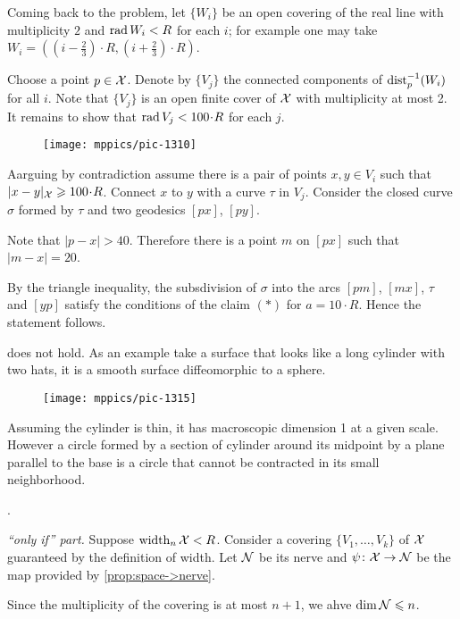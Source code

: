 Coming back to the problem, let $\{W_i\}$ be an open covering of the real line with multiplicity $2$ and $\mathop{\rm rad}\nolimits W_i<R$ for each $i$;
for example one may take $W_i=((i-\tfrac23)\cdot R,(i+\tfrac23)\cdot R)$.

Choose a point $p\in \mathcal{X}$.
Denote by $\{V_j\}$ the connected components of $\mathrm{dist}_p^{-1}(W_i)$ for all $i$.
Note that $\{V_j\}$ is an open finite cover of $\mathcal{X}$ with multiplicity at most 2.
It remains to show that $\rad V_j<100\cdot R$ for each $j$.

\begin{wrapfigure}{o}{31 mm}
\vskip-2mm
\centering
\texttt{[image: mppics/pic-1310]}
\end{wrapfigure}

Aarguing by contradiction assume there is a pair of points  $x,y\in V_i$ 
such that $|x\z-y|_{\spc{X}}\ge 100\cdot R$.
Connect $x$ to $y$ with a curve $\tau$ in $V_j$.
Consider the closed curve $\sigma$ formed by $\tau$ and two geodesics $[px]$, $[py]$.


Note that $|p-x|>40$.
Therefore there is a point $m$ on $[px]$ such that $|m-x|=20$.

By the triangle inequality, the subsdivision of $\sigma$ into the arcs $[pm]$, $[mx]$, $\tau$ and $[yp]$ satisfy the conditions of the claim $({*})$ for $a=10\cdot R$.
Hence the statement follows.

 does not hold.
As an example take a surface that looks like a long cylinder with two hats,
it is a smooth surface diffeomorphic to a sphere.
\begin{figure}[h!]
\vskip0mm
\centering
\texttt{[image: mppics/pic-1315]}
\end{figure}
Assuming the cylinder is thin, it has macroscopic dimension 1 at a given scale.
However a circle formed by a section of cylinder around its midpoint by a plane parallel to the base is a circle that cannot be contracted in its small neighborhood.

 \cite[Appendix 1(E$_{2}$)]{gromov-1983}.

\parbf{\ref{ex:width=suprad(inv)},} \textit{``only if'' part.}
Suppose $\operatorname{\rm width}\nolimits_n\mathcal{X}<R$.
Consider a covering $\{V_1,\dots,V_k\}$ of $\mathcal{X}$ guaranteed by the definition of width.
Let $\mathcal{N}$ be its nerve and $\psi\colon\mathcal{X}\to \mathcal{N}$ be the map provided by \ref{prop:space->nerve}.

Since the multiplicity of the covering is at most $n+1$, we ahve $\operatorname{\rm dim}\nolimits \mathcal{N}\leqslant n$.

